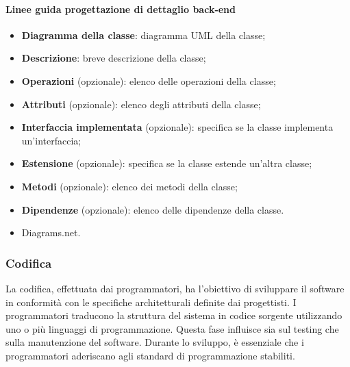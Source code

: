 \paragraph*{Linee guida progettazione di dettaglio back-end}
\begin{itemize}
  \item \textbf{Diagramma della classe}: diagramma UML della classe;
  \item \textbf{Descrizione}: breve descrizione della classe;
  \item \textbf{Operazioni} (opzionale): elenco delle operazioni della classe;
  \item \textbf{Attributi} (opzionale): elenco degli attributi della classe; 
  \item \textbf{Interfaccia implementata} (opzionale): specifica se la classe implementa un'interfaccia;
  \item \textbf{Estensione} (opzionale): specifica se la classe estende un'altra classe;
  \item \textbf{Metodi} (opzionale): elenco dei metodi della classe; 
  \item \textbf{Dipendenze} (opzionale): elenco delle dipendenze della classe.
\end{itemize}

\IntroStrumenti
\begin{itemize}
  \item Diagrams.net.
\end{itemize}

\subsubsection{Codifica}\label{codifica}

\par La codifica, effettuata dai programmatori, ha l'obiettivo di sviluppare il software in conformità con le specifiche architetturali definite dai progettisti. I programmatori traducono la struttura del sistema in codice sorgente utilizzando uno o più linguaggi di programmazione. Questa fase influisce sia sul testing che sulla manutenzione del software. Durante lo sviluppo, è essenziale che i programmatori aderiscano agli standard di programmazione stabiliti.

